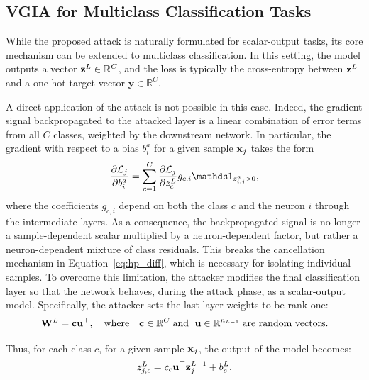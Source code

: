 \subsection{VGIA for Multiclass Classification Tasks}\label{sec:multiclass_vgia}

While the proposed attack is naturally formulated for scalar-output tasks, its core mechanism can be extended to multiclass classification. In this setting, the model outputs a vector ${\mathbf{z}}^{L} \in \mathbb{R}^C$, and the loss is typically the cross-entropy between ${\mathbf{z}}^{L}$ and a one-hot target vector $\mathbf{y} \in \mathbb{R}^C$.

A direct application of the attack is not possible in this case. Indeed, the gradient signal backpropagated to the attacked layer is a linear combination of error terms from all $C$ classes, weighted by the downstream network. 
In particular, the gradient with respect to a bias $b_i^a$ for a given sample ${\mathbf{x}}_j$ takes the form
\begin{equation}\label{eq:grad_fact}
    \frac{\partial \mathcal{L}_j}{\partial b_i^a} = \sum_{c=1}^{C} \frac{\partial \mathcal{L}_j}{\partial z_c^{L}} g_{c,i} \indicator_{z_{i,j}^{a}>0},
\end{equation}
where the coefficients $g_{c,i}$ depend on both the class $c$ and the neuron $i$ through the intermediate layers.
As a consequence, the backpropagated signal is no longer a sample-dependent scalar multiplied by a neuron-dependent factor, but rather a neuron-dependent mixture of class residuals. This breaks the cancellation mechanism in Equation~\eqref{eq:hp_diff}, which is necessary for isolating individual samples. To overcome this limitation, the attacker modifies the final classification layer so that the network behaves, during the attack phase, as a scalar-output model. Specifically, the attacker sets the last-layer weights to be rank one:
\begin{equation}
    \mathbf{W}^L=\mathbf{c}\mathbf{u}^{\top}, \quad \textrm{where} \quad 
    \mathbf{c}\in\mathbb{R}^C\;\text{and  }\;
    \mathbf{u}\in\mathbb{R}^{n_{L-1}} \;\text{are random vectors.}
\end{equation}

Thus, for each class $c$, for a given sample ${\mathbf{x}}_j$, the output of the model becomes:
\begin{equation}
    z_{j,c}^L=c_c\mathbf{u}^{\top} {\mathbf{z}}^{L-1}_j + b_c^L.
\end{equation}

